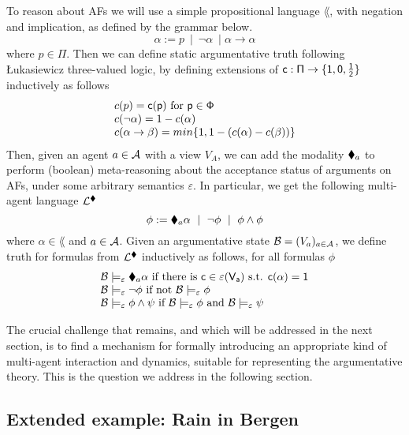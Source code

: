 \documentclass[greybox]{svmult}
\newcommand{\clab}{\sf c}
\newcommand{\views}{\mathcal B}
\newcommand{\sem}{\varepsilon}
\begin{document}
To reason about AFs we will use a simple propositional language $\lang$, with negation and implication, as defined by the grammar below.
$$
\alpha := p \ \mid \ \neg \alpha \ \mid \alpha \to \alpha 
$$
where $p \in \Pi$. Then we can define static argumentative truth following {\L}ukasiewicz three-valued logic, by defining extensions of $\clab: \Pi \to \three$ inductively as follows
\begin{equation}\label{eq:lsem}
\begin{array}{l}
\overline \clab(p) = \clab(p) \text{ for } p \in \Phi \\
\overline \clab(\neg \alpha) = 1 - \overline \clab(\alpha) \\
\overline \clab(\alpha \to \beta) = min\{1,1-(\overline \clab(\alpha) - \overline \clab(\beta))\}
\end{array}
\end{equation}
Then, given an agent $a \in \mathcal A$ with a view $V_A$, we can add the modality $\blacklozenge_a$ to perform (boolean) meta-reasoning about the acceptance status of arguments on AFs, under some arbitrary semantics $\sem$. In particular, we get the following multi-agent language $\mathcal L^{\blacklozenge}$
$$
\phi := \blacklozenge_a \alpha \ \mid \ \neg \phi \ \mid \ \phi \land \phi $$ where $\alpha \in \lang$ and $a \in \mathcal A$. Given an argumentative state $\views = (V_a)_{a\in \agents}$, we define truth for formulas from $\mathcal L^{\blacklozenge}$ inductively as follows, for all formulas $\phi$
\begin{equation}\label{eq:asem}
\begin{array}{l}
\views \models_\sem \cdia_a \alpha \text{ if there is } \clab \in \sem(V_a) \text{ s.t. } \overline \clab(\alpha) = 1 \\
\views \models_\sem \neg \phi \text{ if not } \views \models_\sem \phi \\
\views \models_\sem \phi \land \psi \text{ if } \views \models_\sem \phi \text{ and } \views \models_\sem \psi 
\end{array}
\end{equation}

The crucial challenge that remains, and which will be addressed in the next section, is to find a mechanism for formally introducing an appropriate kind of multi-agent interaction and dynamics, suitable for representing the argumentative theory. This is the question we address in the following section.

\subsection{Extended example: Rain in Bergen}\label{ex:run}
\end{document}
